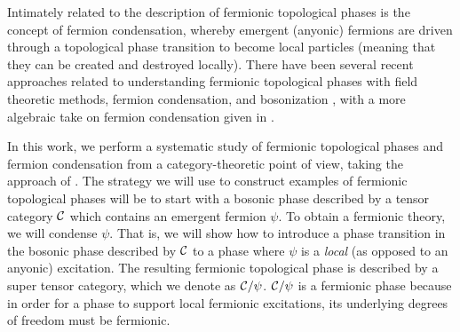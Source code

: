 Intimately related to the description of fermionic topological phases is the concept of fermion condensation, 
whereby emergent (anyonic) fermions are driven through a topological phase transition to become 
local particles (meaning that they can be created and destroyed locally). 
There have been several recent approaches related to understanding 
fermionic topological phases with field theoretic methods, fermion condensation, and bosonization \cite{gaiotto2016, bhardwaj2016, bhardwaj2016b,kapustin2017,putrov2016}, 
with a more algebraic take on fermion condensation given in \cite{wan2016}. 

In this work, we perform a systematic study of fermionic topological phases and fermion condensation from a category-theoretic
point of view, taking the approach of \cite{Walker2014,Walker2015}. 
The strategy we will use to construct examples of fermionic topological phases will be to start with 
a bosonic phase described by a tensor category $\mathcal{C}$
which contains an emergent fermion $\psi$.
To obtain a fermionic theory, we will condense $\psi$.
That is, we will show how to introduce a phase transition 
in the bosonic phase 
described by $\mathcal{C}$ to a phase where $\psi$ is a {\it local} (as opposed to an anyonic) excitation.
The resulting fermionic topological phase is described by a super tensor category, which we denote
as $\mathcal{C} / \psi$.
$\mathcal{C}/\psi$ is a fermionic phase because in order for a phase to support local fermionic excitations, 
its underlying degrees of freedom must be fermionic. 

